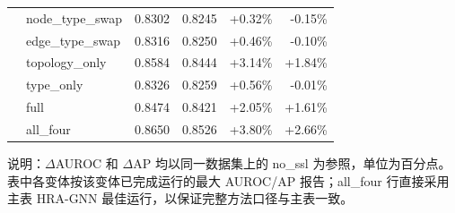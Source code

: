 \begin{table}[t]
\begin{tabular}{llrrrr}
 & node\_type\_swap & 0.8302 & 0.8245 & +0.32\% & -0.15\% \\
 & edge\_type\_swap & 0.8316 & 0.8250 & +0.46\% & -0.10\% \\
 & topology\_only & 0.8584 & 0.8444 & +3.14\% & +1.84\% \\
 & type\_only & 0.8326 & 0.8259 & +0.56\% & -0.01\% \\
 & full & 0.8474 & 0.8421 & +2.05\% & +1.61\% \\
 & all\_four & 0.8650 & 0.8526 & +3.80\% & +2.66\% \\
\bottomrule
\end{tabular}%
\par\vspace{2pt}
\begin{minipage}{\textwidth}
\scriptsize
说明：$\Delta$AUROC 和 $\Delta$AP 均以同一数据集上的 no\_ssl 为参照，单位为百分点。表中各变体按该变体已完成运行的最大 AUROC/AP 报告；all\_four 行直接采用主表 HRA-GNN 最佳运行，以保证完整方法口径与主表一致。
\end{minipage}
\end{table}
